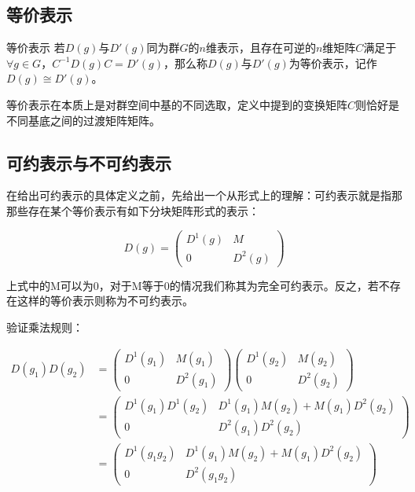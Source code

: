 
\begin{issues}
\issueDraft
\issueMissDepend
\end{issues}

\subsection{等价表示}
\begin{definition}{等价表示}
若$D(g)$与$D'(g)$同为群$G$的$n$维表示，且存在可逆的$n$维矩阵$C$满足于$\forall g\in G$，$C^{-1}D(g)C=D'(g)$，那么称$D(g)$与$D'(g)$为等价表示，记作$D(g)\cong D'(g)$。
\end{definition}

等价表示在本质上是对群空间中基的不同选取，定义中提到的变换矩阵$C$则恰好是不同基底之间的过渡矩阵矩阵。

\subsection{可约表示与不可约表示}

在给出可约表示的具体定义之前，先给出一个从形式上的理解：可约表示就是指那那些存在某个等价表示有如下分块矩阵形式的表示：

\begin{equation}
D(g)=\begin{pmatrix}
 D^1(g) & M\\
 0 & D^2(g)
\end{pmatrix}
\end{equation}

上式中的M可以为0，对于M等于0的情况我们称其为完全可约表示。反之，若不存在这样的等价表示则称为不可约表示。

验证乘法规则：

\begin{align}
D(g_1)D(g_2)&=
\begin{pmatrix}
 D^1(g_1) & M(g_1)\\
 0 & D^2(g_1)
\end{pmatrix}
\begin{pmatrix}
 D^1(g_2) & M(g_2)\\
 0 & D^2(g_2)
\end{pmatrix} \\
&=\begin{pmatrix}
 D^1(g_1)D^1(g_2) & D^1(g_1)M(g_2)+M(g_1)D^2(g_2)\\
 0 & D^2(g_1)D^2(g_2)
\end{pmatrix} \\
&=\begin{pmatrix}
 D^1(g_1g_2) & D^1(g_1)M(g_2)+M(g_1)D^2(g_2)\\
 0 & D^2(g_1g_2)
\end{pmatrix}
\end{align}

